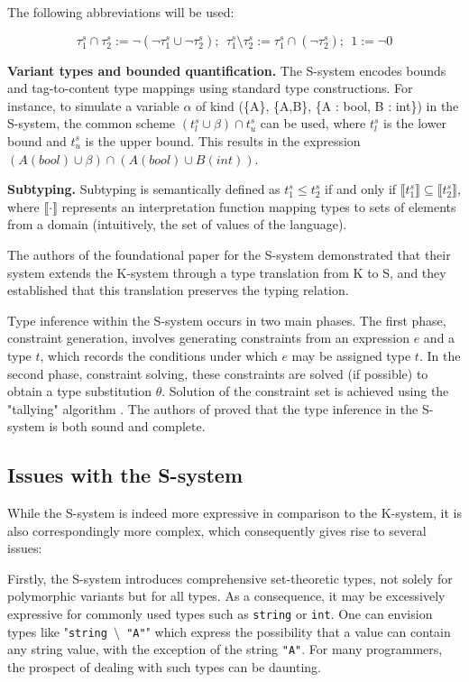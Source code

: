 \documentclass[a4paper,11pt,oneside]{article}
\theoremstyle{definition}
\begin{document}
The following abbreviations will be used:

$$ \tau_1^s \cap \tau_2^s := \neg(\neg\tau_1^s \cup \neg\tau_2^s);\ \ \tau_1^s \setminus \tau_2^s := \tau_1^s \cap (\neg\tau_2^s);\ \ 1 := \neg 0 $$

\textbf{Variant types and bounded quantification.} The S-system encodes bounds and tag-to-content type mappings using standard type constructions. For instance, to simulate a variable $\alpha$ of kind (\{A\}, \{A,B\}, \{A : bool, B : int\}) in the S-system, the common scheme $(t^s_l \cup \beta) \cap t^s_u$ can be used, where $t^s_l$ is the lower bound and $t^s_u$ is the upper bound. This results in the expression $(A(bool) \cup \beta) \cap (A(bool) \cup B(int))$.

\textbf{Subtyping.} Subtyping is semantically defined as $t^s_1 \leq t^s_2$ if and only if $\llbracket t^s_1\rrbracket \subseteq \llbracket t^s_2\rrbracket$, where $\llbracket\cdot\rrbracket$ represents an interpretation function mapping types to sets of elements from a domain (intuitively, the set of values of the language).

The authors of the foundational paper for the S-system demonstrated that their system extends the K-system through a type translation from K to S, and they established that this translation preserves the typing relation.

Type inference within the S-system occurs in two main phases. The first phase, constraint generation, involves generating constraints from an expression $e$ and a type $t$, which records the conditions under which $e$ may be assigned type $t$. In the second phase, constraint solving, these constraints are solved (if possible) to obtain a type substitution $\theta$. Solution of the constraint set is achieved using the "tallying" algorithm \cite{Castagna_2015}. The authors of \cite{Castagna_2016} proved that the type inference in the S-system is both sound and complete.

\subsection{Issues with the S-system}

While the S-system is indeed more expressive in comparison to the K-system, it is also correspondingly more complex, which consequently gives rise to several issues:

Firstly, the S-system introduces comprehensive set-theoretic types, not solely for polymorphic variants but for all types. As a consequence, it may be excessively expressive for commonly used types such as \texttt{string} or \texttt{int}. One can envision types like "\texttt{string $\setminus$ "A"}" which express the possibility that a value can contain any string value, with the exception of the string \texttt{"A"}. For many programmers, the prospect of dealing with such types can be daunting.
\end{document}

